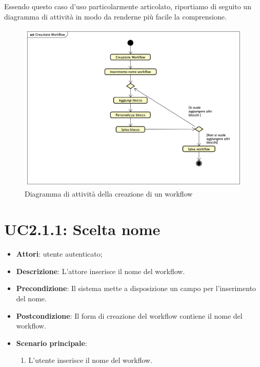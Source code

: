 Essendo questo caso d'uso particolarmente articolato, riportiamo di seguito un diagramma di attività in modo da renderne più facile la comprensione.
\begin{figure} 
	\centering
	\includegraphics[scale=0.4]{./Diagram/CreazioneWorkflow.png}
	\caption{Diagramma di attività della creazione di un workflow}\label{}
\end{figure}



\section{UC2.1.1: Scelta nome}
\label{UC2.1.1}

\begin{itemize}
	\item \textbf{Attori}: utente autenticato;
	\item \textbf{Descrizione}: L'attore inserisce il nome del workflow.
	\item \textbf{Precondizione}: Il sistema mette a disposizione un campo per l'inserimento del nome.
	\item \textbf{Postcondizione}: Il form di creazione del workflow contiene il nome del workflow.
	\item \textbf{Scenario principale}:
	\begin{enumerate} \item L'utente inserisce il nome del workflow.\end{enumerate}
\end{itemize}

